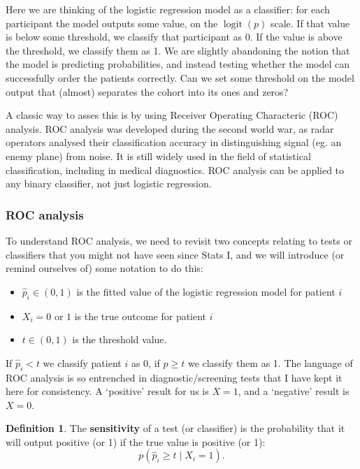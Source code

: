 \documentclass[
  openany]{book}
\providecommand{\tightlist}{%
  \setlength{\itemsep}{0pt}\setlength{\parskip}{0pt}}
\theoremstyle{definition}
\newtheorem{definition}{Definition}[chapter]
\theoremstyle{definition}
\theoremstyle{definition}
\theoremstyle{definition}
\theoremstyle{remark}
\begin{document}
Here we are thinking of the logistic regression model as a classifier: for each participant the model outputs some value, on the \(\operatorname{logit}\left(p\right)\) scale. If that value is below some threshold, we classify that participant as 0. If the value is above the threshold, we classify them as 1. We are slightly abandoning the notion that the model is predicting probabilities, and instead testing whether the model can successfully order the patients correctly. Can we set some threshold on the model output that (almost) separates the cohort into its ones and zeros?

A classic way to asses this is by using Receiver Operating Characteric (ROC) analysis. ROC analysis was developed during the second world war, as radar operators analysed their classification accuracy in distinguishing signal (eg. an enemy plane) from noise. It is still widely used in the field of statistical classification, including in medical diagnostics. ROC analysis can be applied to any binary classifier, not just logistic regression.

\subsubsection{ROC analysis}\label{roc-analysis}

To understand ROC analysis, we need to revisit two concepts relating to tests or classifiers that you might not have seen since Stats I, and we will introduce (or remind ourselves of) some notation to do this:

\begin{itemize}
\tightlist
\item
  \(\hat{p}_i\in\left(0,1\right)\) is the fitted value of the logistic regression model for patient \(i\)
\item
  \(X_i=0\) or \(1\) is the true outcome for patient \(i\)
\item
  \(t\in\left(0,1\right)\) is the threshold value.
\end{itemize}

If \(\hat{p}_i<t\) we classify patient \(i\) as 0, if \(\hat{p}\geq t\) we classify them as 1. The language of ROC analysis is so entrenched in diagnostic/screening tests that I have kept it here for consistency. A `positive' result for us is \(X=1\), and a `negative' result is \(X=0\).

\begin{definition}
The \textbf{sensitivity} of a test (or classifier) is the probability that it will output positive (or 1) if the true value is positive (or 1):
\[p\left(\hat{p}_i \geq t \mid{X_i=1}\right).\]
\end{definition}
\end{document}
